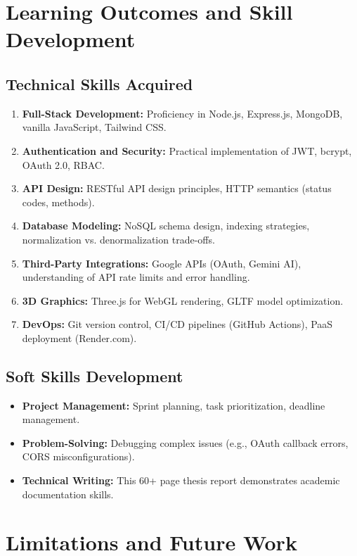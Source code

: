 \documentclass[12pt, a4paper]{report}
\begin{document}
\section{Learning Outcomes and Skill Development}

\subsection{Technical Skills Acquired}

\begin{enumerate}
    \item \textbf{Full-Stack Development:} Proficiency in Node.js, Express.js, MongoDB, vanilla JavaScript, Tailwind CSS.
    \item \textbf{Authentication and Security:} Practical implementation of JWT, bcrypt, OAuth 2.0, RBAC.
    \item \textbf{API Design:} RESTful API design principles, HTTP semantics (status codes, methods).
    \item \textbf{Database Modeling:} NoSQL schema design, indexing strategies, normalization vs. denormalization trade-offs.
    \item \textbf{Third-Party Integrations:} Google APIs (OAuth, Gemini AI), understanding of API rate limits and error handling.
    \item \textbf{3D Graphics:} Three.js for WebGL rendering, GLTF model optimization.
    \item \textbf{DevOps:} Git version control, CI/CD pipelines (GitHub Actions), PaaS deployment (Render.com).
\end{enumerate}

\subsection{Soft Skills Development}

\begin{itemize}
    \item \textbf{Project Management:} Sprint planning, task prioritization, deadline management.
    \item \textbf{Problem-Solving:} Debugging complex issues (e.g., OAuth callback errors, CORS misconfigurations).
    \item \textbf{Technical Writing:} This 60+ page thesis report demonstrates academic documentation skills.
\end{itemize}

\section{Limitations and Future Work}
\end{document}
